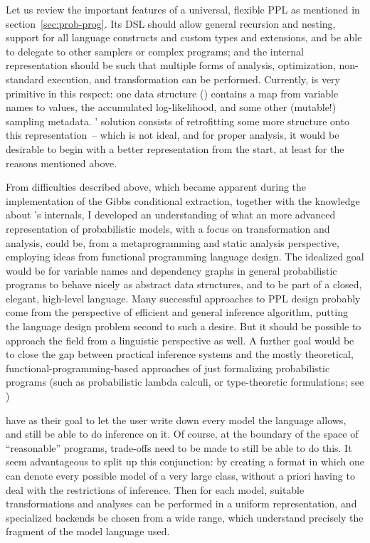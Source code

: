 Let us review the important features of a universal, flexible PPL as mentioned in
section~\ref{sec:prob-prog}.  Its DSL should allow general recursion and nesting, support for all
language constructs and custom types and extensions, and be able to delegate to other samplers or
complex programs; and the internal representation should be such that multiple forms of analysis,
optimization, non-standard execution, and transformation can be performed.  Currently, \turingjl{}
is very primitive in this respect: one data structure () contains a map from variable
names to values, the accumulated log-likelihood, and some other (mutable!) sampling
metadata. \autogibbsjl{}' solution consists of retrofitting some more structure onto this
representation~-- which is not ideal, and for proper analysis, it would be desirable to begin with a
better representation from the start, at least for the reasons mentioned above.

From difficulties described above, which became apparent during the implementation of the Gibbs
conditional extraction, together with the knowledge about \dppljl{}'s internals, I developed an
understanding of what an more advanced representation of probabilistic models, with a focus on
transformation and analysis, could be, from a metaprogramming and static analysis perspective,
employing ideas from functional programming language design.  The idealized goal would be for
variable names and dependency graphs in general probabilistic programs to behave nicely as abstract
data structures, and to be part of a closed, elegant, high-level language.  Many successful
approaches to PPL design probably come from the perspective of efficient and general inference
algorithm, putting the language design problem second to such a desire.  But it should be possible
to approach the field from a linguistic perspective as well.  A further goal would be to close the
gap between practical inference systems and the mostly theoretical, functional-programming-based
approaches of just formalizing probabilistic programs (such as probabilistic lambda calculi, or
type-theoretic formulations; see
\textcite{ramsey2002stochastic,heunen2017convenient,bhat2012type,scibior2015practical})

 have as their goal to let the user write down every model the language
allows, and still be able to do inference on it.  Of course, at the boundary of the space of
\enquote{reasonable} programs, trade-offs need to be made to still be able to do this.  It seem
advantageous to split up this conjunction: by creating a format in which one can denote every
possible model of a very large class, without a priori having to deal with the restrictions of
inference.  Then for each model, suitable transformations and analyses can be performed in a uniform
representation, and specialized backends be chosen from a wide range, which understand precisely the
fragment of the model language used.

